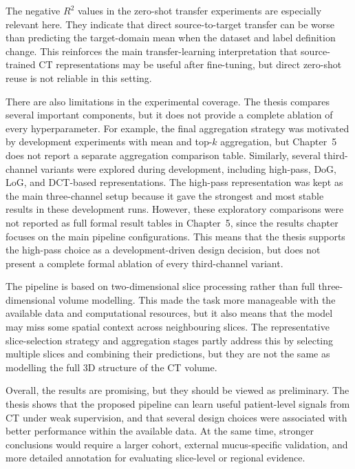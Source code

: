 The negative \(R^2\) values in the zero-shot transfer experiments are especially relevant here. They indicate that direct source-to-target transfer can be worse than predicting the target-domain mean when the dataset and label definition change. This reinforces the main transfer-learning interpretation that source-trained CT representations may be useful after fine-tuning, but direct zero-shot reuse is not reliable in this setting.

There are also limitations in the experimental coverage. The thesis compares several important components, but it does not provide a complete ablation of every hyperparameter. For example, the final aggregation strategy was motivated by development experiments with mean and top-\(k\) aggregation, but Chapter~5 does not report a separate aggregation comparison table. Similarly, several third-channel variants were explored during development, including high-pass, DoG, LoG, and DCT-based representations. The high-pass representation was kept as the main three-channel setup because it gave the strongest and most stable results in these development runs. However, these exploratory comparisons were not reported as full formal result tables in Chapter~5, since the results chapter focuses on the main pipeline configurations. This means that the thesis supports the high-pass choice as a development-driven design decision, but does not present a complete formal ablation of every third-channel variant. 

The pipeline is based on two-dimensional slice processing rather than full three-dimensional volume modelling. This made the task more manageable with the available data and computational resources, but it also means that the model may miss some spatial context across neighbouring slices. The representative slice-selection strategy and aggregation stages partly address this by selecting multiple slices and combining their predictions, but they are not the same as modelling the full 3D structure of the CT volume.

Overall, the results are promising, but they should be viewed as preliminary. The thesis shows that the proposed pipeline can learn useful patient-level signals from CT under weak supervision, and that several design choices were associated with better performance within the available data. At the same time, stronger conclusions would require a larger cohort, external mucus-specific validation, and more detailed annotation for evaluating slice-level or regional evidence.


